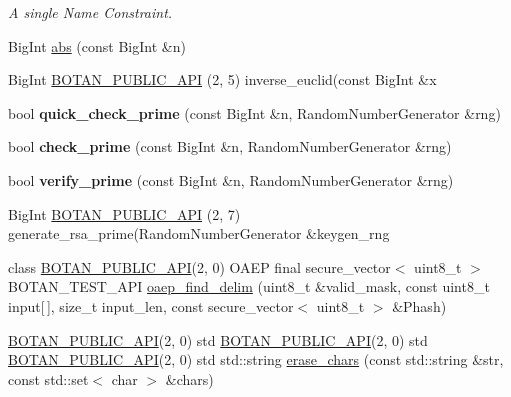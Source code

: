 \begin{DoxyCompactItemize}
\begin{DoxyCompactList}\small\item\em A single Name Constraint. \end{DoxyCompactList}\item 
Big\+Int \hyperlink{namespace_botan_a481ae8e7fe0268600101ab74663f3f16}{abs} (const Big\+Int \&n)
\item 
Big\+Int \hyperlink{namespace_botan_a0f25b10ed41d28e8a0f7026b35b96838}{B\+O\+T\+A\+N\+\_\+\+P\+U\+B\+L\+I\+C\+\_\+\+A\+PI} (2, 5) inverse\+\_\+euclid(const Big\+Int \&x
\item 
\mbox{\label{namespace_botan_a84349165e2e06442d77db64cdb76bfee}} 
bool {\bfseries quick\+\_\+check\+\_\+prime} (const Big\+Int \&n, Random\+Number\+Generator \&rng)
\item 
\mbox{\label{namespace_botan_af6f2e869065b1860fa41959f72ce6dd8}} 
bool {\bfseries check\+\_\+prime} (const Big\+Int \&n, Random\+Number\+Generator \&rng)
\item 
\mbox{\label{namespace_botan_aaafcd26fc5a710d6c4656e1201d4d1be}} 
bool {\bfseries verify\+\_\+prime} (const Big\+Int \&n, Random\+Number\+Generator \&rng)
\item 
Big\+Int \hyperlink{namespace_botan_ac0aa93839be18def47da04e0a2068d2e}{B\+O\+T\+A\+N\+\_\+\+P\+U\+B\+L\+I\+C\+\_\+\+A\+PI} (2, 7) generate\+\_\+rsa\+\_\+prime(Random\+Number\+Generator \&keygen\+\_\+rng
\item 
class \hyperlink{namespace_botan_a6b9388030d872e586a4655b776ac9501}{B\+O\+T\+A\+N\+\_\+\+P\+U\+B\+L\+I\+C\+\_\+\+A\+PI}(2, 0) O\+A\+EP final secure\+\_\+vector$<$ uint8\+\_\+t $>$ B\+O\+T\+A\+N\+\_\+\+T\+E\+S\+T\+\_\+\+A\+PI \hyperlink{namespace_botan_a9f4036fc0551d10598b35ff39b67042b}{oaep\+\_\+find\+\_\+delim} (uint8\+\_\+t \&valid\+\_\+mask, const uint8\+\_\+t input\mbox{[}$\,$\mbox{]}, size\+\_\+t input\+\_\+len, const secure\+\_\+vector$<$ uint8\+\_\+t $>$ \&Phash)
\item 
\hyperlink{namespace_botan_a6b9388030d872e586a4655b776ac9501}{B\+O\+T\+A\+N\+\_\+\+P\+U\+B\+L\+I\+C\+\_\+\+A\+PI}(2, 0) std \hyperlink{namespace_botan_a6b9388030d872e586a4655b776ac9501}{B\+O\+T\+A\+N\+\_\+\+P\+U\+B\+L\+I\+C\+\_\+\+A\+PI}(2, 0) std \hyperlink{namespace_botan_a6b9388030d872e586a4655b776ac9501}{B\+O\+T\+A\+N\+\_\+\+P\+U\+B\+L\+I\+C\+\_\+\+A\+PI}(2, 0) std std\+::string \hyperlink{namespace_botan_a1e86875d4abdb177fbdcd7b30a2b62da}{erase\+\_\+chars} (const std\+::string \&str, const std\+::set$<$ char $>$ \&chars)

\end{DoxyCompactItemize}
